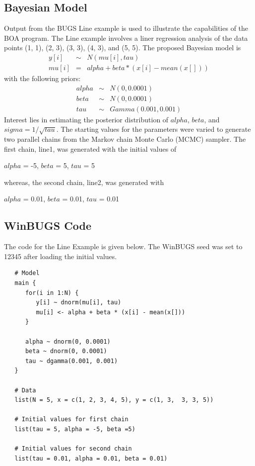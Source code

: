 \documentclass[12pt,letterpaper]{report}
\begin{document}
\subsection{Bayesian Model}
\noindent Output from the BUGS Line example is used to illustrate
the capabilities of the BOA program. The Line example involves a
liner regression analysis of the data points (1, 1), (2, 3), (3,
3), (4, 3), and (5, 5). The proposed Bayesian model is
\begin{eqnarray}
\nonumber
   y[i] &\sim& N(mu[i], tau) \\
\nonumber
   mu[i] &=& alpha + beta * (x[i] - mean(x[]))
\end{eqnarray}
with the following priors:
\begin{eqnarray}
\nonumber
   alpha &\sim& N(0, 0.0001) \\
\nonumber
   beta  &\sim& N(0, 0.0001) \\
\nonumber
   tau   &\sim& Gamma(0.001, 0.001)
\end{eqnarray}
Interest lies in estimating the posterior distribution of $alpha$, $beta$,
and $sigma = 1 / \sqrt{tau}$. The starting values for the parameters were varied
to generate two parallel chains from the Markov chain Monte Carlo (MCMC)
sampler. The first chain, line1, was generated with the initial values of
\begin{center}
$alpha$ = -5, $beta$ = 5, $tau$ = 5
\end{center}
whereas, the second chain, line2, was generated with
\begin{center}
$alpha$ = 0.01, $beta$ = 0.01, $tau$ = 0.01
\end{center}


\subsection{WinBUGS Code}
\noindent The code for the Line Example is given below.  The
WinBUGS seed was set to 12345 after loading the initial values.
\begin{small}
\begin{verbatim}
   # Model
   main {
      for(i in 1:N) {
         y[i] ~ dnorm(mu[i], tau)
         mu[i] <- alpha + beta * (x[i] - mean(x[]))
      }

      alpha ~ dnorm(0, 0.0001)
      beta ~ dnorm(0, 0.0001)
      tau ~ dgamma(0.001, 0.001)
   }

   # Data
   list(N = 5, x = c(1, 2, 3, 4, 5), y = c(1, 3,  3, 3, 5))

   # Initial values for first chain
   list(tau = 5, alpha = -5, beta =5)

   # Initial values for second chain
   list(tau = 0.01, alpha = 0.01, beta = 0.01)
\end{verbatim}
\end{small}
\end{document}
